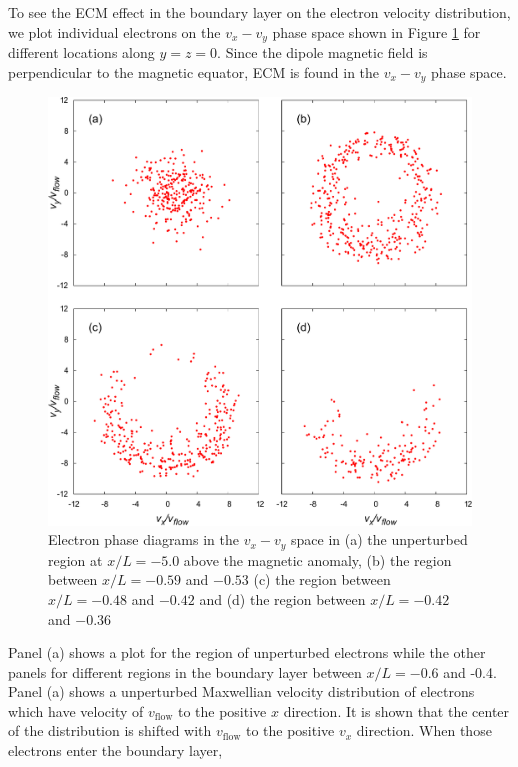 \documentclass[draft,jgrga]{agutex2015}
\begin{document}
\begin{article}

To see the ECM effect in the boundary layer on the electron velocity distribution, 
we plot individual electrons on the $v_x-v_y$ phase space 
shown in Figure \ref{fig:10} for different locations along $y=z=0$.
Since the dipole magnetic field is perpendicular to the magnetic equator, 
ECM is found in the $v_x-v_y$ phase space.
\begin{figure}
\centering
\noindent\includegraphics[width=15cm]{./figures/Fig_10_bb-crop.pdf}
\caption{Electron phase diagrams in the $v_{x}-v_{y}$ space in 
(a) the unperturbed region at $x/L = -5.0$ above the magnetic anomaly, 
(b) the region between $x/L =-0.59$ and $-0.53$  
(c) the region between $x/L =-0.48$ and $-0.42$ and
(d) the region between $x/L =-0.42$ and $-0.36$ }
\label{fig:10}
\end{figure}
Panel (a) shows a plot for the region of 
unperturbed electrons while the other panels
for different regions in the boundary layer between $x/L = -0.6$ and -0.4.
Panel (a) shows a unperturbed Maxwellian velocity distribution of electrons
which have velocity of $v_{\mathrm{flow}}$ to the positive $x$ direction.
It is shown that the center of the distribution is shifted with $v_{\mathrm{flow}}$ 
to the positive $v_x$ direction.
%
When those electrons enter the boundary layer, 

\end{article}
\end{document}
